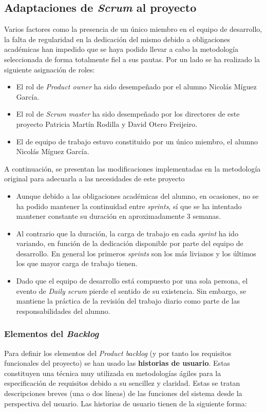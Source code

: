 \subsection{Adaptaciones de \textit{Scrum} al proyecto}
\label{subsec:adaptaciones-scrum}

Varios factores como la presencia de un único miembro en el equipo de desarrollo, la falta de regularidad en la dedicación del mismo debido a obligaciones académicas han impedido que se haya podido llevar a cabo la metodología seleccionada de forma totalmente fiel a sus pautas. Por un lado se ha realizado la siguiente asignación de roles:

\begin{itemize}
    \item El rol de \textit{Product owner} ha sido desempeñado por el alumno Nicolás Míguez García.
    \item El rol de \textit{Scrum master} ha sido desempeñado por los directores de este proyecto Patricia Martín Rodilla y David Otero Freijeiro.
    \item El de equipo de trabajo estuvo constituido por un único miembro, el alumno Nicolás Míguez García.
\end{itemize}

A continuación, se presentan las modificaciones implementadas en la metodología original para adecuarla a las necesidades de este proyecto

\begin{itemize}
    \item Aunque debido a las obligaciones académicas del alumno, en ocasiones, no se ha podido mantener la continuidad entre \textit{sprints}, sí que se ha intentado mantener constante su duración en aproximadamente 3 semanas.
    \item Al contrario que la duración, la carga de trabajo en cada \textit{sprint} ha ido variando, en función de la dedicación disponible por parte del equipo de desarrollo. En general los primeros \textit{sprints} son los más livianos y los últimos los que mayor carga de trabajo tienen.
    \item Dado que el equipo de desarrollo está compuesto por una sola persona, el evento de \textit{Daily scrum} pierde el sentido de su existencia. Sin embargo, se mantiene la práctica de la revisión del trabajo diario como parte de las responsabilidades del alumno.
\end{itemize}

\subsubsection{Elementos del \textit{Backlog}}
Para definir los elementos del \textit{Product backlog} (y por tanto los requisitos funcionales del proyecto) se han usado las \textbf{historias de usuario}. Estas constituyen una técnica muy utilizada en metodologías ágiles para la especificación de requisitos debido a su sencillez y claridad. Estas se tratan descripciones breves (una o dos líneas) de las funciones del sistema desde la perspectiva del usuario. Las historias de usuario tienen de la siguiente forma:

